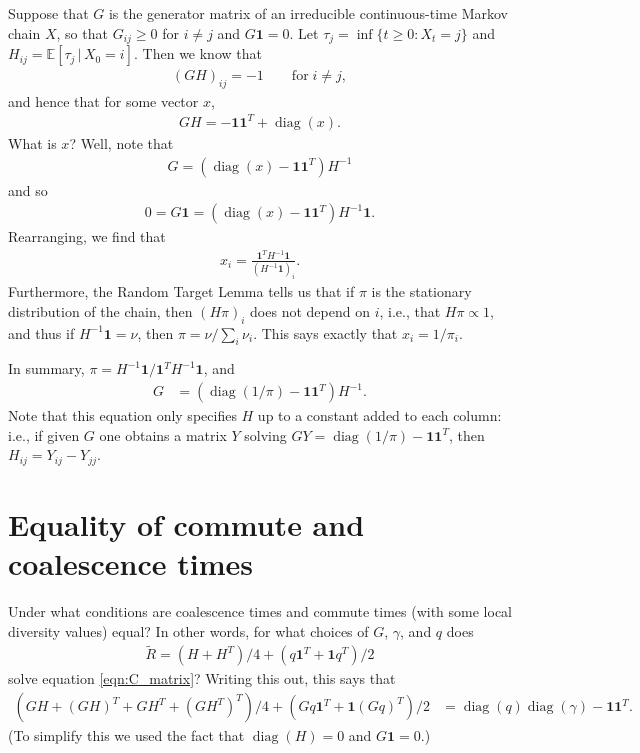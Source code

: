 \documentclass{article}
\newcommand{\comdist}{\widetilde{R}}
\DeclareMathOperator{\diag}{\mathop{\mbox{diag}}}
\newcommand{\E}{\mathbb{E}}
\newcommand{\bone}{\mathbf{1}}
\begin{document}
Suppose that $G$ is the generator matrix of an irreducible continuous-time Markov chain $X$,
so that $G_{ij} \ge 0$ for $i \neq j$ and $G \bone = 0$.
Let $\tau_{j} = \inf\{t \ge 0 : X_t = j\}$ and $H_{ij} = \E[\tau_j \,|\, X_0 = i]$.
Then we know that
\begin{align*}
    (G H)_{ij} = -1 \qquad \text{for} \; i \neq j ,
\end{align*}
and hence that for some vector $x$,
\begin{align} \label{eqn:GH}
    GH = - \bone \bone^T + \diag(x).
\end{align}
What is $x$?  Well, note that
\begin{align*}
    G = (\diag(x) - \bone \bone^T) H^{-1}
\end{align*}
and so
\begin{align*}
    0 = G\bone 
    = (\diag(x) - \bone \bone^T) H^{-1} \bone  .
\end{align*}
Rearranging, we find that
\begin{align*}
    x_i = \frac{ \bone^T H^{-1} \bone }{ (H^{-1} \bone)_i } .
\end{align*}
Furthermore,
the Random Target Lemma \citep{aldous-fill-2014}
tells us that if $\pi$ is the stationary distribution of the chain, then 
$(H \pi)_i$ does not depend on $i$,
i.e., that $H \pi \propto 1$,
and thus if $H^{-1} \bone = \nu$, 
then $\pi = \nu / \sum_i \nu_i$.
This says exactly that $x_i = 1/\pi_i$.

In summary, $\pi = H^{-1} \bone / \bone^T H^{-1} \bone$, and 
\begin{align}
    G 
    &= (\diag(1/\pi) - \bone \bone^T) H^{-1} .
\end{align}
Note that this equation only specifies $H$ up to a constant added to each column:
i.e., if given $G$ one obtains a matrix $Y$ solving $GY = \diag(1/\pi) - \bone \bone^T$,
then $H_{ij} = Y_{ij} - Y_{jj}$.


\section{Equality of commute and coalescence times}
\label{sec:com_eq_coal}

Under what conditions are coalescence times and commute times (with some local diversity values) equal?
In other words, for what choices of $G$, $\gamma$, and $q$ does
\begin{align}
    \comdist = (H + H^T)/4 + (q \bone^T + \bone q^T)/2
\end{align}
solve equation \eqref{eqn:C_matrix}?
Writing this out, this says that
\begin{align} \label{eqn:R_coal}
    ( GH + (GH)^T + GH^T + (GH^T)^T )/4 + (Gq \bone^T + \bone (Gq)^T)/2
    &=
    \diag(q) \diag(\gamma) - \bone \bone^T .
\end{align}
(To simplify this we used the fact that $\diag(H) = 0$ and $G\bone = 0$.)
\end{document}
